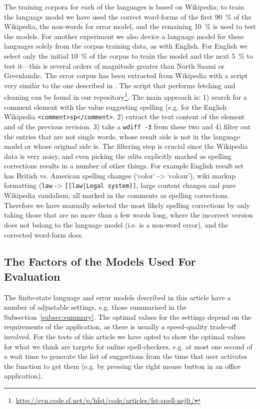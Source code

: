 \documentclass[a4paper,12pt]{article}
\begin{document}
The training corpora for each of the languages is based on Wikipedia; to train
the language model we have used the correct word-forms of the first 90~\% of
the Wikipedia, the non-words for error model, and the remaining 10~\% is used
to test the models. For another experiment we also device a language model for
these languages solely from the corpus training data, as with English.  For
English we select only the initial 10~\% of the corpus to train the model and
the next 5~\% to test it---this is several orders of magnitude greater than
North Saami or Greenlandic. The error corpus has been extracted from Wikipedia
with a script very similar to the one described in \cite{max2010mining}. The
script that performs fetching and cleaning can be found in our
repository\footnote{\url{http://svn.code.sf.net/p/hfst/code/articles/fst-spell-nejlt/}}. The main approach is: 1) search for a comment
element with the value suggesting spelling (e.g. for the English Wikipedia
\texttt{<comment>sp</comment>}. 2) extract the text content of the element and
of the previous revision. 3) take a \texttt{wdiff -3} from these two and 4)
filter out the entries that are not single words, whose result side is not in
the language model or whose original side is.  The filtering step is crucial
since the Wikipedia data is very noisy, and even picking the edits explicitly
marked as spelling corrections results in a number of other things. For example
English result set has British vs.  American spelling changes (`color' ->
`colour'), wiki markup formatting (\texttt{law} -> \texttt{[[law|Legal
system]]}, large content changes and pure Wikipedia vandalism, all marked in
the comments as spelling corrections. Therefore we have manually selected the
most likely spelling corrections by only taking those that are no more than a
few words long, where the incorrect version does not belong to the language
model (i.e.  is a non-word error), and the corrected word-form does.

\subsection{The Factors of the Models Used For Evaluation}
\label{subsec:factors}

The finite-state language and error models described in this article have a
number of adjustable settings, e.g. those summarised in the
Subsection~\ref{subsec:summary}. The optimal values for the settings depend on
the requirements of the application, as there is usually a speed-quality
trade-off involved. For the tests of this article we have opted to show the
optimal values for what we think are targets for online spell-checkers, e.g. at
most one second of a wait time to generate the list of suggestions from the
time that user activates the function to get them (e.g. by pressing the right
mouse button in an office application).
\end{document}
